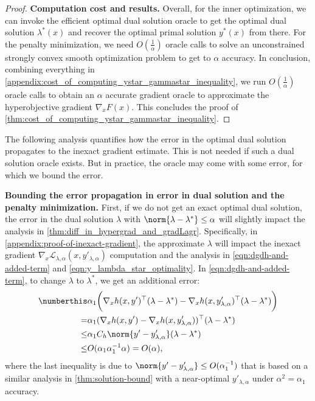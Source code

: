 \begin{proof}
\noindent\textbf{Computation cost and results.}
Overall, for the inner optimization, we can invoke the efficient optimal dual solution oracle to get the optimal dual solution $\lambda^*(x)$ and recover the optimal primal solution $y^*(x)$ from there.
For the penalty minimization, we need $O(\frac{1}{\alpha})$ oracle calls to solve an unconstrained strongly convex smooth optimization problem to get to $\alpha$ accuracy.
In conclusion, combining everything in \cref{appendix:cost_of_computing_ystar_gammastar_inequality}, we run $O(\frac{1}{\alpha})$ oracle calls to obtain an $\alpha$ accurate gradient oracle to approximate the hyperobjective gradient $\nabla_x F(x)$. This concludes the proof of \cref{thm:cost_of_computing_ystar_gammastar_inequality}.
\end{proof}

\begin{remark}
    The following analysis  quantifies how the error in the optimal dual solution propagates to the inexact gradient estimate. This is not needed if such a dual solution oracle exists. But in practice, the oracle may come with some error, for which we bound the error.
\end{remark}

\noindent\textbf{Bounding the error propagation in error in dual solution and the penalty minimization.}
First, if we do not get an exact optimal dual solution, the error in the dual solution $\lambda$ with $\norm{\lambda - \lambda^*} \leq \alpha$ will slightly impact the analysis in \cref{thm:diff_in_hypergrad_and_gradLagr}. Specifically, in \cref{appendix:proof-of-inexact-gradient}, the approximate $\lambda$ will impact the inexact gradient $\nabla_x \mathcal{L}_{\lambda,\alpha}(x,y'_{\lambda,\alpha})$ computation and the analysis in \cref{eqn:dgdh-and-added-term} and \cref{eqn:y_lambda_star_optimality}.
    In \cref{eqn:dgdh-and-added-term}, to change $\lambda$ to $\lambda^*$, we get an additional error:
    \begin{align*}\numberthis\label{eqn:dual-convergence-merit-function-1}
        & \alpha_1 \biggl( \nabla_x h(x,y')^\top (\lambda - \lambda^*) - \nabla_x h(x,y'_{\lambda,\alpha})^\top (\lambda - \lambda^*) \biggl) \nonumber \\
        = & \alpha_1 (\nabla_x h(x,y') - \nabla_x h(x,y'_{\lambda,\alpha}))^\top (\lambda - \lambda^*) \nonumber \\
        \leq & \alpha_1 C_h \norm{y' - y'_{\lambda,\alpha}} (\lambda - \lambda^*) \nonumber \\
        \leq & O(\alpha_1 \alpha_1^{-1} \alpha) = O(\alpha), 
    \end{align*}
    where the last inequality is due to $\norm{y' - y'_{\lambda,\alpha}} \leq O(\alpha_1^{-1})$ that is based on a similar analysis in \cref{thm:solution-bound} with a near-optimal $y'_{\lambda,\alpha}$ under $\alpha^2 = \alpha_1$ accuracy.
    
